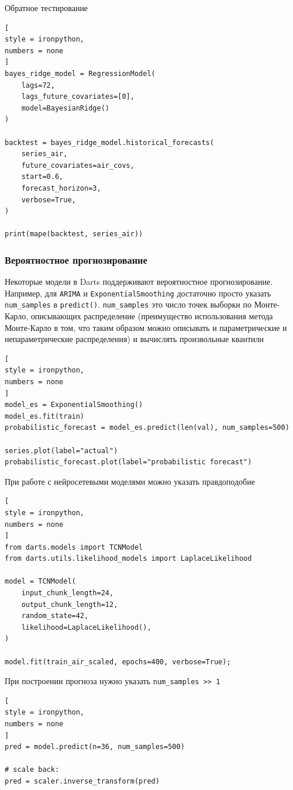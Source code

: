\documentclass[%
	11pt,
	a4paper,
	utf8,
		]{article}
\begin{document}
Обратное тестирование 
\begin{lstlisting}[
style = ironpython,
numbers = none
]
bayes_ridge_model = RegressionModel(
    lags=72,
    lags_future_covariates=[0],
    model=BayesianRidge()
)

backtest = bayes_ridge_model.historical_forecasts(
    series_air,
    future_covariates=air_covs,
    start=0.6,
    forecast_horizon=3,
    verbose=True,
)

print(mape(backtest, series_air))
\end{lstlisting}

\subsubsection{Вероятностное прогнозирование}

Некоторые модели в Darts поддерживают вероятностное прогнозирование. Например, для \verb|ARIMA| и \verb|ExponentialSmoothing| достаточно просто указать \verb|num_samples| в \verb|predict()|. \verb|num_samples| это число точек выборки по Монте-Карло, описывающих распределение (преимущество использования метода Монте-Карло в том, что таким образом можно описывать и параметрические и непараметрические распределения) и вычислять произвольные квантили
\begin{lstlisting}[
style = ironpython,
numbers = none
]
model_es = ExponentialSmoothing()
model_es.fit(train)
probabilistic_forecast = model_es.predict(len(val), num_samples=500)

series.plot(label="actual")
probabilistic_forecast.plot(label="probabilistic forecast")
\end{lstlisting}

При работе с нейросетевыми моделями можно указать правдоподобие
\begin{lstlisting}[
style = ironpython,
numbers = none
]
from darts.models import TCNModel
from darts.utils.likelihood_models import LaplaceLikelihood

model = TCNModel(
	input_chunk_length=24,
	output_chunk_length=12,
	random_state=42,
	likelihood=LaplaceLikelihood(),
)

model.fit(train_air_scaled, epochs=400, verbose=True);
\end{lstlisting}

При построении прогноза нужно указать \verb|num_samples >> 1|
\begin{lstlisting}[
style = ironpython,
numbers = none
]
pred = model.predict(n=36, num_samples=500)

# scale back:
pred = scaler.inverse_transform(pred)
\end{lstlisting}
\end{document}
